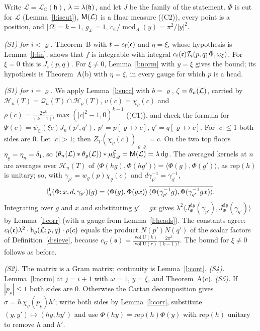 \documentclass[11pt,a4paper]{article}
\makeatletter
\theoremstyle{plainx}
\theoremstyle{uprightx}
\renewenvironment{proof}[1][Proof]{\par\pushQED{\qed}\normalfont\topsep0pt\partopsep0pt
  \trivlist\item[\hskip\labelsep\itshape #1.]\ignorespaces}{\popQED\endtrivlist\@endpefalse}
\newcommand{\cL}{\mathcal{L}}
\newcommand{\CC}{\mathbb{C}}
\newcommand{\dd}{\mathrm{d}}
\newcommand{\Hl}[2]{\mathcal{H}_{#1}(#2)}
\newcommand{\Ql}[2]{\mathcal{Q}_{#1}(#2)}
\newcommand{\modA}{\operatorname{mod}_A}
\newcommand{\ZT}[2]{Z_{#1}(#2)}
\newcommand{\wl}[2]{w_{#1}(#2)}
\newcommand{\ip}[2]{\langle #1,#2\rangle}
\newcommand{\gL}[1]{g_{#1}}
\newcommand{\vol}{\operatorname{vol}}
\newcommand{\cLC}[1]{\mathcal{L}_{\CC}(#1)}
\newcommand{\volU}[1]{\vol\mathrm{U}(#1)}
\newcommand{\cellc}[1]{c_G(#1)}
\newcommand{\corr}[3]{J^{#1}_{#2}(#3)}
\newcommand{\boost}[2]{\chi_{#1}(#2)}
\newcommand{\Inp}[1]{\textup{(#1)}}
\makeatother
\begin{document}
\begin{proof}[Proof of Theorem E]
Write $\cL=\cLC{\mathfrak{h}}$, $\lambda=\lambda(\mathfrak{h})$, and let $J$ be the family of the statement.
$\Phi$ is cut for $\cL$ (Lemma~\ref{l:iscut}), $\groupMeasure{\cL}$ is a Haar measure (\Inp{C2}), every point is a
position, and $|\Omega|=k-1$, $\gL{\cL}=1$, $c_{\CC}/\modA(y)=\pi^2/|y|^2$.

\emph{\textup{(S1)} for $i<\varrho$.} Theorem~B with $t=c_{\mathrm{f}}(\mathfrak{c})$ and $\eta=\xi$, whose hypothesis is
Lemma~\ref{l:fin}, shows that $f$ is integrable with integral
$c_{\mathrm{f}}(\mathfrak{c})\mathcal{I}_{i}(p,q;\Phi,\omega_\xi)$. For $\xi=0$ this is $J_i(p,q)$. For $\xi\ne0$,
Lemma~\ref{l:norm} with $y=\xi$ gives the bound; its hypothesis is Theorem~A(b) with $\eta=\xi$, in every gauge for
which $p$ is a head.

\emph{\textup{(S1)} for $i=\varrho$.} We apply Lemma~\ref{l:succ} with $b=\varrho$,
$\zeta=\floorMeasure{\cL}{n}$, carried by $\Hl{n}{T}=\Ql{n}{T}\cap\Hl{\varrho}{T}$, $v(c)=\boost{\varrho}{c}$ and
$\rho(c)=\frac{2\pi^k}{(k-1)!}\max(|c|^2-1,0)^{k-1}$ (\Inp{C1}), and check the formula for
$\Psi(c)=\psi_{\CC}(\xi c)J_n(p',q')$, $p'=p[\varrho\mapsto c]$, $q'=q[\varrho\mapsto c]$. For $|c|\le1$ both sides
are $0$. Let $|c|>1$; then $\ZT{T}{\boost{\varrho}{c}}_{\varrho\varrho}=c$. On the two top floors
$\eta_\varrho=\eta_n=\delta_1$, so $(\floorMeasure{\cL}{n}*\floorMeasure{\cL}{\varrho})*\stackMeasure{\cL}_{0,\varrho}
=\groupMeasure{\cL}=\lambda\,\dd y$. The averaged kernels at $n$ are averages over $\Hl{n}{T}$ of
$\ip{\Phi(hg)}{\Phi(hg')}=\ip{\Phi(g)}{\Phi(g')}$, as $\mathrm{rep}(h)$ is unitary; so, with
$\gamma_{p'}=\wl{\varrho}{p}\boost{\varrho}{c}$ and $d\gamma_{p'}^{-1}=\gamma_{q'}^{-1}$,
\[\formIntegrandOne{n}{\Phi}{x}{d}{\gamma_{p'}}{g}=\ip{\Phi(g)}{\Phi(gx)}\,\overline{\ip{\Phi(\gamma_{p'}^{-1}g)}{\Phi(\gamma_{q'}^{-1}gx)}}.\]
Integrating over $g$ and $x$ and substituting $y'=gx$ gives $\lambda^2\ip{\corr{\dd y}{\Phi}{\gamma_{p'}}}{\corr{\dd y}{\Phi}{\gamma_{q'}}}$
by Lemma~\ref{l:corr} (with a gauge from Lemma~\ref{l:heads}). The constants agree:
$\formConst{\mathfrak{c}}\lambda^2\cdot\headDensity{\varrho}{p}{q}{\cL}\cdot\rho(c)$ equals the product $N(p')N(q')$ of
the scalar factors of Definition~\ref{d:sieve}, because
$\cellc{\mathfrak{s}}=\frac{\volU{k}}{\volU{r}}\frac{2\pi^k}{(k-1)!}$. The bound for $\xi\ne0$ follows as before.

\emph{\textup{(S2)}.} The matrix is a Gram matrix; continuity is Lemma~\ref{l:cont}.
\emph{\textup{(S4)}.} Lemma~\ref{l:norm} at $j=i+1$ with $\omega=1$, $y=\xi$, and Theorem~A(c).
\emph{\textup{(S5)}.} If $|p_\varrho|\le1$ both sides are $0$. Otherwise the Cartan decomposition gives
$\sigma=h\,\boost{\varrho}{p_\varrho}h'$; write both sides by Lemma~\ref{l:corr}, substitute $(y,y')\mapsto(hy,hy')$ and
use $\Phi(hy)=\mathrm{rep}(h)\Phi(y)$ with $\mathrm{rep}(h)$ unitary to remove $h$ and $h'$.


\end{proof}
\end{document}
